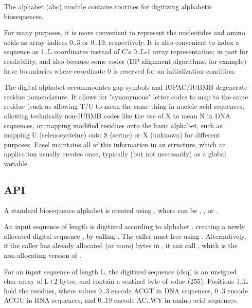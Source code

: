 The alphabet (abc) module contains routines for digitizing alphabetic
biosequences.

For many purposes, it is more convenient to represent the nucleotides
and amino acids as array indices 0..3 or 0..19, respectively. It is
also convenient to index a sequence as 1..L coordinates instead of C's
0..L-1 array representation; in part for readability, and also because
some codes (DP alignment algorithms, for example) have boundaries
where coordinate 0 is reserved for an initialization condition.

The digital alphabet accommodates gap symbols and IUPAC/IUBMB
degenerate residue nomenclature. It allows for "synonymous" letter
codes to map to the same residue (such as allowing T/U to mean the
same thing in nucleic acid sequences, allowing technically non-IUBMB
codes like the use of X to mean N in DNA sequences, or mapping
modified residues onto the basic alphabet, such as mapping U
(selenocysteine) onto S (serine) or X (unknown) for different
purposes. Easel maintains all of this information in an
 structure, which an application usually creates
once, typically (but not necessarily) as a global variable.

\subsection{API}

A standard biosequence alphabet is created using
, where  can be
, , or .

An input sequence  of length  is digitized
according to alphabet , creating a newly allocated digital
sequence , by calling
. The caller
must free  using .  Alternatively, if the
caller has already allocated  (or more) bytes in
, it can call , which is the non-allocating version of
. 

For an input sequence of length L, the digitized sequence (dsq) is an
unsigned char array of L+2 bytes.  and 
contain a sentinel byte of value  (255).  Positions
1..L hold the residues, where values 0..3 encode ACGT in DNA
sequences, 0..3 encode ACGU in RNA sequences, and 0..19 encode AC..WY
in amino acid sequences.

